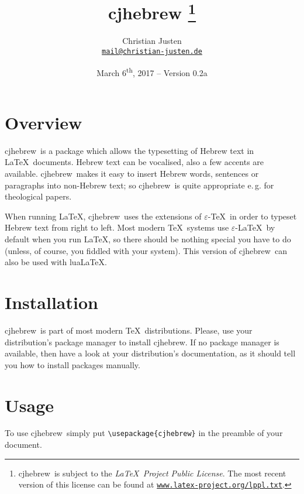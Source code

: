 \documentclass[a4paper,10pt]{article}
\def\cjh{\textsf{cjhebrew}}
\def\!#1!{\texttt{#1}}
\def\cjhebversion{0.2a}
\newcommand{\eTeX}{$\varepsilon$-\TeX}
\newcommand{\eLaTeX}{$\varepsilon$-\LaTeX}
\begin{document}
\title{\cjh%
    \footnote{\cjh\ is subject to the \textit{\LaTeX\ Project Public
    License}. The most recent version of this license can be found at
    \href{http://www.latex-project.org/lppl.txt}{\!www.latex-project.org/lppl.txt!}.}%
}

\author{Christian Justen\\
\href{mailto:mail@christian-justen.de}{{\small\!mail@christian-justen.de!}}}

\date{March 6\textsuperscript{th}, 2017 -- Version \cjhebversion}

\maketitle


\section{Overview}

\cjh\ is a package which allows the typesetting of Hebrew text in
\LaTeX\ documents. Hebrew text can be vocalised, also a few
accents are available. \cjh\ makes it easy to insert Hebrew words,
sentences or paragraphs into non-Hebrew text; so \cjh\ is quite
appropriate e.\,g. for theological papers.

When running \LaTeX, \cjh\ uses the extensions of \eTeX\ in order to
typeset Hebrew text from right to left.  Most modern \TeX\ systems use
\eLaTeX\ by default when you run \LaTeX, so there should be nothing
special you have to do (unless, of course, you fiddled with your
system).  This version of \cjh\ can also be used with lua\LaTeX.


\section{Installation}

\cjh\ is part of most modern \TeX\ distributions.  Please, use your
distribution's package manager to install \cjh.  If no package manager
is available, then have a look at your distribution's documentation,
as it should tell you how to install packages manually.



\section{Usage}

To use \cjh\ simply put \verb!\usepackage{cjhebrew}! in the
preamble of your document.
\end{document}
